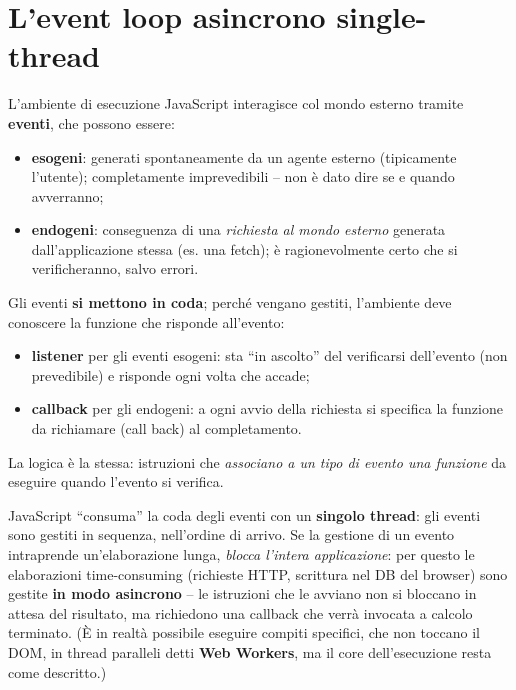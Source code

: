 \section{L'event loop asincrono single-thread}

L'ambiente di esecuzione JavaScript interagisce col mondo esterno tramite \textbf{eventi},
che possono essere:
\begin{itemize}
  \item \textbf{esogeni}: generati spontaneamente da un agente esterno (tipicamente l'utente);
        completamente imprevedibili -- non \`e dato dire se e quando avverranno;
  \item \textbf{endogeni}: conseguenza di una \emph{richiesta al mondo esterno} generata
        dall'applicazione stessa (es. una fetch); \`e ragionevolmente certo che si
        verificheranno, salvo errori.
\end{itemize}
Gli eventi \textbf{si mettono in coda}; perch\'e vengano gestiti, l'ambiente deve conoscere la
funzione che risponde all'evento:
\begin{itemize}
  \item \textbf{listener} per gli eventi esogeni: sta ``in ascolto'' del verificarsi
        dell'evento (non prevedibile) e risponde ogni volta che accade;
  \item \textbf{callback} per gli endogeni: a ogni avvio della richiesta si specifica la
        funzione da richiamare (call back) al completamento.
\end{itemize}
La logica \`e la stessa: istruzioni che \emph{associano a un tipo di evento una funzione} da
eseguire quando l'evento si verifica.

\begin{importante}
JavaScript ``consuma'' la coda degli eventi con un \textbf{singolo thread}: gli eventi sono
gestiti in sequenza, nell'ordine di arrivo. Se la gestione di un evento intraprende
un'elaborazione lunga, \emph{blocca l'intera applicazione}: per questo le elaborazioni
time-consuming (richieste HTTP, scrittura nel DB del browser) sono gestite \textbf{in modo
asincrono} -- le istruzioni che le avviano non si bloccano in attesa del risultato, ma
richiedono una callback che verr\`a invocata a calcolo terminato.
(\`E in realt\`a possibile eseguire compiti specifici, che non toccano il DOM, in thread
paralleli detti \textbf{Web Workers}, ma il core dell'esecuzione resta come descritto.)
\end{importante}

